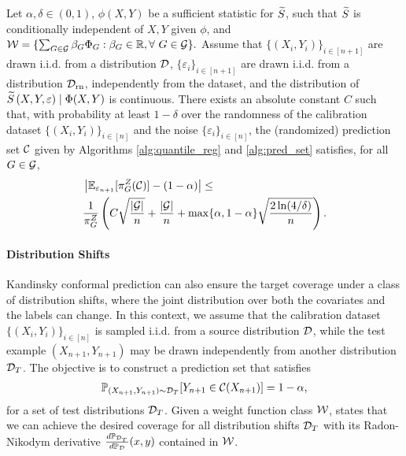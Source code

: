 \begin{corollary}
\label{cor: fract-cov}
Let $\alpha, \delta \in (0,1)$, $\phi(X,Y)$ be a sufficient statistic for ${\widetilde{S}}$, such that ${\widetilde{S}}$ is conditionally independent of $X,Y$ given $\phi$, and
    $
        {\cal W} = \{\sum_{G \in {\cal G}} \beta_G \Phi_G: \beta_G \in \mathbb{R}, \forall~G\in{\cal G}\}.
    $
    Assume that $\{(X_i,Y_i)\}_{i\in [n+1]}$ are drawn \mbox{i.i.d.} from a distribution ${\cal D}$, $\{\varepsilon_i\}_{i\in [n+1]}$ are drawn \mbox{i.i.d.} from a distribution ${\cal D}_{\text{rn}}$, independently from the dataset, and the distribution of ${\widetilde{S}}\left(X,Y, \varepsilon\right) \mid \Phi(X,Y)$ is continuous. There exists an absolute constant $C$ such that, with probability at least $1-\delta$ over the randomness of the calibration dataset $\{(X_i,Y_i)\}_{i\in [n]}$ and the noise $\{\varepsilon_i\}_{i \in [n]}$, the (randomized) prediction set ${\cal C}$ given by Algorithms \ref{alg:quantile_reg} and \ref{alg:pred_set} satisfies, for all $G \in {\cal G}$,
    \begin{align*}
    &\left|\mathbb{E}_{\varepsilon_{n+1}}[\pi^Z_{G}({\cal C})] -(1-\alpha)\right| \leq \\
    &\frac{1}{\pi_G^Z} 
     \left( C\sqrt{\frac{|{\cal G}|}{n}}+\frac{|{\cal G}|}{n}+\max \{\alpha, 1-\alpha\}\sqrt{\frac{2\ln(4/\delta)}{n}}  \right).
    \end{align*}     
\end{corollary}
 


\paragraph{Distribution Shifts}

Kandinsky conformal prediction can also ensure the target coverage under a class of distribution shifts, where the joint distribution over both the covariates and the labels can change. In this context, we assume that the calibration dataset $\{(X_i,Y_i)\}_{i\in[n]}$ is sampled \mbox{i.i.d.} from a source distribution ${\cal D}$, while the test example $(X_{n+1}, Y_{n+1})$ may be drawn independently from another distribution ${\cal D}_{T}$. The objective is to construct a prediction set that satisfies
\begin{align*}
    \mathbb{P}_{(X_{n+1}, Y_{n+1})\sim {\cal D}_T} [Y_{n+1} \in {\cal C}(X_{n+1})] = 1-\alpha,
\end{align*}
for a set of test distributions ${\cal D}_T$. Given a weight function class ${\cal W}$,  states that we can achieve the desired coverage for all distribution shifts ${\cal D}_{T}$ with its Radon-Nikodym derivative $\frac{d\mathbb{P}_{{\cal D}_{T}}}{d\mathbb{P}_{{\cal D}}}(x,y)$ contained in ${\cal W}$. 

